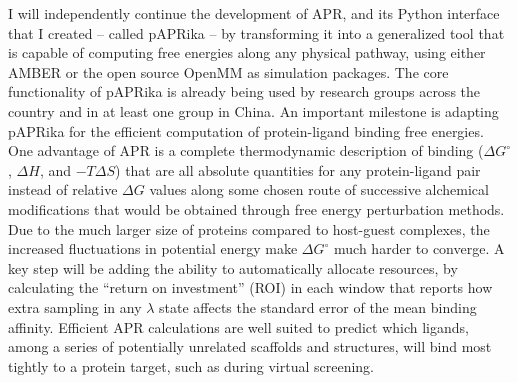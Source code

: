 \documentclass[11pt,notitlepage]{article}
\begin{document}
I will independently continue the development of APR, and its Python
interface that I created -- called pAPRika -- by transforming it into a
generalized tool that is capable of computing free energies along any
physical pathway, using either AMBER or the open source OpenMM as
simulation packages. The core functionality of pAPRika is already being
used by research groups across the country and in at least one group in
China. An important milestone is adapting pAPRika for the efficient
computation of protein-ligand binding free energies. One advantage of
APR is a complete thermodynamic description of binding
(\(\Delta G^\circ\), \(\Delta H\), and \(-T \Delta S\)) that are all
absolute quantities for any protein-ligand pair instead of relative
\(\Delta G\) values along some chosen route of successive alchemical
modifications that would be obtained through free energy perturbation
methods. Due to the much larger size of proteins compared to host-guest
complexes, the increased fluctuations in potential energy make
\(\Delta G^\circ\) much harder to converge. A key step will be adding
the ability to automatically allocate resources, by calculating the
``return on investment'' (ROI) in each window that reports how extra
sampling in any \(\lambda\) state affects the standard error of the mean
binding affinity. Efficient APR calculations are well suited to predict
which ligands, among a series of potentially unrelated scaffolds and
structures, will bind most tightly to a protein target, such as during
virtual screening.
\end{document}
